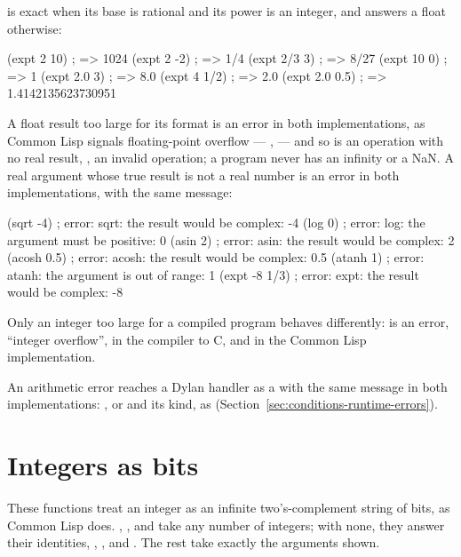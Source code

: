 \noindent {} is exact when its base is rational and its power
is an integer, and answers a float otherwise:

\begin{dylan}
(expt 2 10)      ; => 1024
(expt 2 -2)      ; => 1/4
(expt 2/3 3)     ; => 8/27
(expt 10 0)      ; => 1
(expt 2.0 3)     ; => 8.0
(expt 4 1/2)     ; => 2.0
(expt 2.0 0.5)   ; => 1.4142135623730951
\end{dylan}

\noindent A float result too large for its format is an error in both
implementations, as Common Lisp signals floating-point overflow ---
,  --- and so is an operation
with no real result, , an invalid operation; a program
never has an infinity or a NaN. A real argument whose true result is
not a real number is an error in both implementations, with the same
message:

\begin{dylan}
(sqrt -4)        ; error: sqrt: the result would be complex: -4
(log 0)          ; error: log: the argument must be positive: 0
(asin 2)         ; error: asin: the result would be complex: 2
(acosh 0.5)      ; error: acosh: the result would be complex: 0.5
(atanh 1)        ; error: atanh: the argument is out of range: 1
(expt -8 1/3)    ; error: expt: the result would be complex: -8
\end{dylan}

\noindent Only an integer too large for a compiled program behaves
differently:  is an error, ``integer overflow'', in
the compiler to C, and  in the
Common Lisp implementation.

\noindent An arithmetic error reaches a Dylan handler as a
 with the same message in both implementations:
, or  and its kind, as
(Section~\ref{sec:conditions-runtime-errors}).

\section{Integers as bits}\label{sec:numbers-logical}

These functions treat an integer as an infinite two's-complement string
of bits, as Common Lisp does. , ,
 and  take any number of integers; with none,
they answer their identities, , ,  and
. The rest take exactly the arguments shown.

